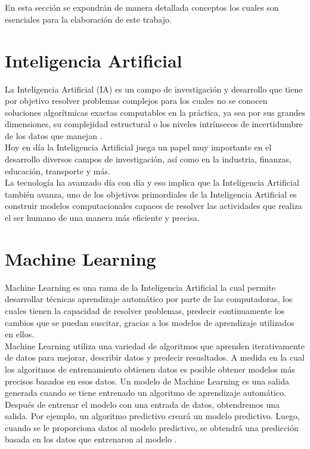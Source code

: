 
\ \\\\
En esta sección se expondrán de manera detallada conceptos los cuales son esenciales para la elaboración 
de este trabajo.

\section{Inteligencia Artificial}
La Inteligencia Artificial (IA) es un campo de investigación y desarrollo que tiene por objetivo resolver 
problemas complejos para los cuales no se conocen soluciones algorítmicas exactas computables en la práctica, 
ya sea por sus grandes dimensiones, su complejidad estructural o los niveles intrínsecos de incertidumbre de 
los datos que manejan \cite{inteligenciaArtificial}.
\\
Hoy en día la Inteligencia Artificial juega un papel muy importante en el desarrollo diversos campos de 
investigación, así como en la industria, finanzas, educación, transporte y más.
\\
La tecnología ha avanzado día con día y eso implica que la Inteligencia Artificial también avanza, uno de 
los objetivos primordiales de la Inteligencia Artificial es construir modelos computacionales capaces de 
resolver las actividades que realiza el ser humano de una manera más eficiente y precisa.


\section{Machine Learning}
Machine Learning es una rama de la Inteligencia Artificial la cual permite  desarrollar técnicas aprendizaje 
automático por parte de las computadoras, los cuales tienen la capacidad de resolver problemas, predecir 
continuamente los cambios que se puedan suscitar, gracias a los modelos de aprendizaje utilizados en ellos.
\\
Machine Learning utiliza una variedad de algoritmos que aprenden iterativamente de datos para mejorar, describir 
datos y predecir resusltados. A medida en la cual los algoritmos de entrenamiento obtienen datos es posible obtener 
modelos más precisos basados en esos datos. Un modelo de Machine Learning es una salida generada cuando se tiene 
entrenado un algoritmo de aprendizaje automático. Después de entrenar el modelo con una entrada de datos, obtendremos 
una salida. Por ejemplo, un algoritmo predictivo creará un modelo predictivo. Luego, cuando se le proporciona datos 
al modelo predictivo, se obtendrá una predicción basada en los datos que entrenaron al modelo \cite{machineLearning}.

